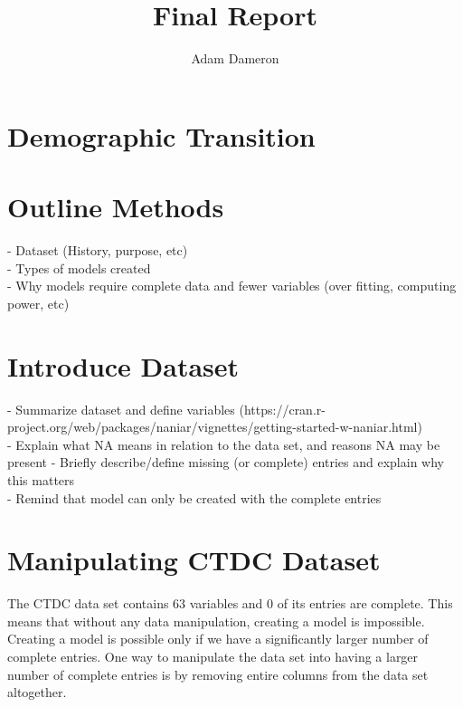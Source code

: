 \documentclass{article} %
\title{Final Report}
\author{
	Adam Dameron
}
\begin{document}
	
	
	\maketitle
	
	\begin{abstract}
		
	\end{abstract}
	
	\section{Demographic Transition}
	
	\section{Outline Methods}
	
	- Dataset (History, purpose, etc)\\
	- Types of models created\\
		- Why models require complete data and fewer variables (over fitting, computing power, etc)
	
	
	\section{Introduce Dataset}
	
	- Summarize dataset and define variables (https://cran.r-project.org/web/packages/naniar/vignettes/getting-started-w-naniar.html)\\
	- Explain what NA means in relation to the data set, and reasons NA may be present
	- Briefly describe/define missing (or complete) entries and explain why this matters\\
	- Remind that model can only be created with the complete entries\\
	
	\newpage
	\section{Manipulating CTDC Dataset}
	

	
	The CTDC data set contains 63 variables and 0 of its entries are complete. This means that without any data manipulation, creating a model is impossible. Creating a model is possible only if we have a significantly larger number of complete entries. One way to manipulate the data set into having a larger number of complete entries is by removing entire columns from the data set altogether. 
	
\end{document}
